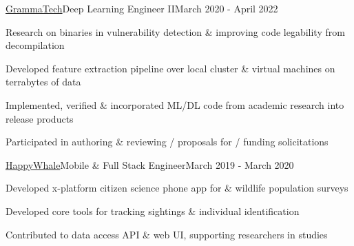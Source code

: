 \documentclass{article}
\newenvironment{**mylist}[4][]%
{%
\subsubsection*{%
    \censor{#2}\tabb #3%
    \if\relax\detokenize{#1}\relax
    \else
      {\;\;(#1)}%
    \fi
    \hfill #4%
}%

\small
  \begin{itemize}%
    \setlength{\topsep}{.2pt}%
    \setlength{\partopsep}{0pt}
    \setlength{\itemsep}{.6pt}%
    \setlength{\parskip}{0pt}%
    \setlength{\parsep}{0pt}%
}%
{%
  \end{itemize}%
}
\newcommand{\LU}[1]{\hspace{-1em}{\bf Technologies : #1}}
\begin{document}
\begin{**mylist}[Security]{\href{https://www.grammatech.com}{GrammaTech}}{Deep Learning Engineer II}{March 2020 - April 2022}
\item Research on binaries in vulnerability detection \& improving code legability from decompilation
\item Developed feature extraction pipeline over local cluster \& virtual machines on terrabytes of data
\item Implemented, verified \& incorporated ML/DL code from academic research into release products
\item Participated in authoring \& reviewing / proposals for / funding solicitations
\end{**mylist}

\begin{**mylist}{\href{www.happywhale.com}{HappyWhale}}{Mobile \& Full Stack Engineer}{March 2019 - March 2020}
\item Developed %
  x-platform citizen science phone app
  for
   \& wildlife population  surveys
\item Developed core tools for tracking  sightings \& individual  identification
\item Contributed to data access API \& web UI, supporting researchers in  studies
\end{**mylist}
\end{document}
